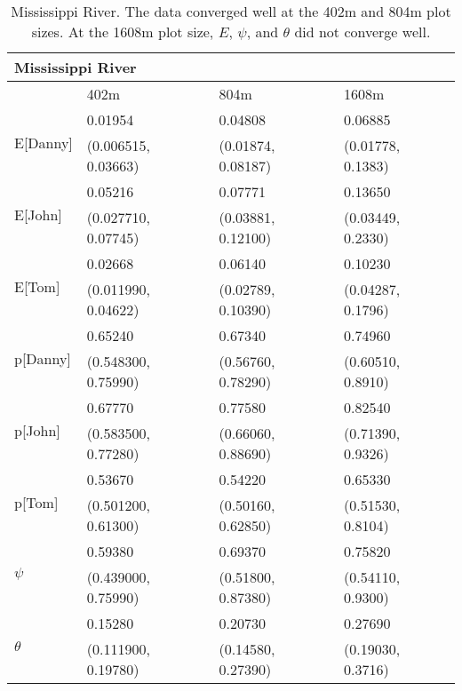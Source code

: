 \documentclass[11pt]{article}
\begin{document}
    \begin{table}
        \caption{Mississippi River. The data converged well at the 402m and
        804m plot sizes. At the 1608m plot size, \(E\), \(\psi\), and
        \(\theta\) did not converge well.}
        \label{Mississippi}
        \begin{center}
            \begin{tabular}{|l|l|l|l|}
                \hline
                \multicolumn{4}{|l|}{\textbf{Mississippi River}} \\
                \hline
                    & 402m & 804m & 1608m \\
                \hline
                \multirow{2}{*}{E[Danny]}
                    & 0.01954 & 0.04808 & 0.06885 \\
                    & (0.006515, 0.03663) & (0.01874, 0.08187) & (0.01778,
                    0.1383) \\
                \hline
                \multirow{2}{*}{E[John]}
                    & 0.05216 & 0.07771 & 0.13650 \\
                    & (0.027710, 0.07745) & (0.03881, 0.12100) & (0.03449,
                    0.2330) \\
                \hline
                \multirow{2}{*}{E[Tom]}
                    & 0.02668 & 0.06140 & 0.10230 \\
                    & (0.011990, 0.04622) & (0.02789, 0.10390) & (0.04287,
                    0.1796) \\
                \hline
                \multirow{2}{*}{p[Danny]}
                    & 0.65240 & 0.67340 & 0.74960 \\
                    & (0.548300, 0.75990) & (0.56760, 0.78290) & (0.60510,
                    0.8910) \\
                \hline
                \multirow{2}{*}{p[John]}
                    & 0.67770 & 0.77580 & 0.82540 \\
                    & (0.583500, 0.77280) & (0.66060, 0.88690) & (0.71390,
                    0.9326) \\
                \hline
                \multirow{2}{*}{p[Tom]}
                    & 0.53670 & 0.54220 & 0.65330 \\
                    & (0.501200, 0.61300) & (0.50160, 0.62850) & (0.51530,
                    0.8104) \\
                \hline
                \multirow{2}{*}{\(\psi\)}
                    & 0.59380 & 0.69370 & 0.75820 \\
                    & (0.439000, 0.75990) & (0.51800, 0.87380) & (0.54110,
                    0.9300) \\
                \hline
                \multirow{2}{*}{\(\theta\)}
                    & 0.15280 & 0.20730 & 0.27690 \\
                    & (0.111900, 0.19780) & (0.14580, 0.27390) & (0.19030,
                    0.3716) \\
                \hline
            \end{tabular}
        \end{center}
    \end{table}
\end{document}
